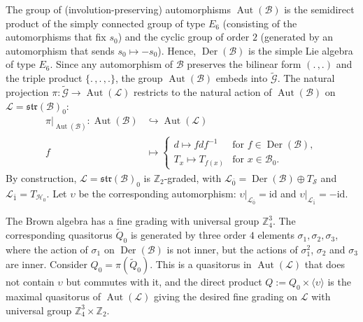 \documentclass[a4paper,reqno]{amsart}
\theoremstyle{definition}
\numberwithin{theorem}{section}
\numberwithin{equation}{section}
\begin{document}
The group of (involution-preserving) automorphisms $\operatorname{\mathrm{Aut}}({\mathcal{B}})$ is the semidirect product of the simply connected group of type $E_6$ (consisting of the automorphisms that fix $s_0$) and the cyclic group of order $2$ (generated by an automorphism that sends $s_0\mapsto-s_0$). Hence, $\operatorname{\mathrm{Der}}({\mathcal{B}})$ is the simple Lie algebra of type $E_6$. Since any automorphism of ${\mathcal{B}}$ preserves the bilinear form $(.\,,.)$ and the triple product $\{.\,,.\,,.\}$, the group $\operatorname{\mathrm{Aut}}({\mathcal{B}})$ embeds into $\tilde{\mathcal{G}}$. The natural projection $\pi:\tilde{\mathcal{G}}\rightarrow\operatorname{\mathrm{Aut}}({\mathcal{L}})$ restricts to the natural action of $\operatorname{\mathrm{Aut}}({\mathcal{B}})$ on ${\mathcal{L}}={\mathfrak{str}}({\mathcal{B}})_0$: 
\[
\begin{split}
\pi\vert_{\operatorname{\mathrm{Aut}}({\mathcal{B}})}:\operatorname{\mathrm{Aut}}({\mathcal{B}})&\hookrightarrow \operatorname{\mathrm{Aut}}({\mathcal{L}})\\
  f\ &\mapsto\begin{cases} d\mapsto fdf^{-1}&\text{for }f\in \operatorname{\mathrm{Der}}({\mathcal{B}}),\\
                           T_x\mapsto T_{f(x)}&\text{for }x\in{\mathcal{B}}_0.
             \end{cases}
\end{split}
\]
By construction, ${\mathcal{L}}={\mathfrak{str}}({\mathcal{B}})_0$ is ${\mathbb{Z}}_2$-graded, with ${\mathcal{L}}{_{\bar 0}}=\operatorname{\mathrm{Der}}({\mathcal{B}})\oplus T_{\mathcal{S}}$ and ${\mathcal{L}}{_{\bar 1}}=T_{{\mathcal{H}}_0}$. Let $\upsilon$ be the corresponding  automorphism: $\upsilon\vert_{{\mathcal{L}}{_{\bar 0}}}={\mathrm{id}}$ and $\upsilon\vert_{{\mathcal{L}}{_{\bar 1}}}=-{\mathrm{id}}$. 

The Brown algebra has a fine grading with universal group ${\mathbb{Z}}_4^3$. The corresponding quasitorus $\tilde Q_0$ is generated by three order $4$ elements $\sigma_1,\sigma_2,\sigma_3$, where the action of $\sigma_1$ on $\operatorname{\mathrm{Der}}({\mathcal{B}})$ is not inner, but the actions of $\sigma_1^2$, $\sigma_2$ and $\sigma_3$ are inner. Consider $Q_0=\pi(\tilde Q_0)$. This is a quasitorus in $\operatorname{\mathrm{Aut}}({\mathcal{L}})$ that does not contain $\upsilon$ but commutes with it, and the direct product $Q{:=} Q_0\times\langle\upsilon\rangle$ is the maximal quasitorus of $\operatorname{\mathrm{Aut}}({\mathcal{L}})$ giving the desired fine grading on ${\mathcal{L}}$ with universal group ${\mathbb{Z}}_4^3\times{\mathbb{Z}}_2$.
\end{document}
